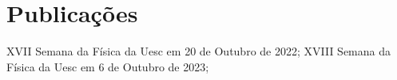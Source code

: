 \chapter{Publicações}
XVII Semana da Física da Uesc em 20 de Outubro de 2022;
XVIII Semana da Física da Uesc em 6 de Outubro de 2023;
